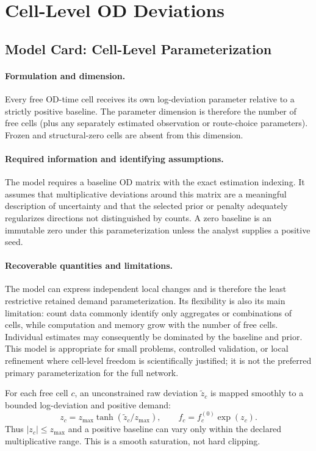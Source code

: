 
\section{Cell-Level OD Deviations}

\subsection{Model Card: Cell-Level Parameterization}

\paragraph{Formulation and dimension.}
Every free OD-time cell receives its own log-deviation parameter relative to a
strictly positive baseline.  The parameter dimension is therefore the number
of free cells (plus any separately estimated observation or route-choice
parameters).  Frozen and structural-zero cells are absent from this dimension.

\paragraph{Required information and identifying assumptions.}
The model requires a baseline OD matrix with the exact estimation indexing.
It assumes that multiplicative deviations around this matrix are a meaningful
description of uncertainty and that the selected prior or penalty adequately
regularizes directions not distinguished by counts.  A zero baseline is an
immutable zero under this parameterization unless the analyst supplies a
positive seed.

\paragraph{Recoverable quantities and limitations.}
The model can express independent local changes and is therefore the least
restrictive retained demand parameterization.  Its flexibility is also its
main limitation: count data commonly identify only aggregates or combinations
of cells, while computation and memory grow with the number of free cells.
Individual estimates may consequently be dominated by the baseline and prior.
This model is appropriate for small problems, controlled validation, or local
refinement where cell-level freedom is scientifically justified; it is not the
preferred primary parameterization for the full network.



For each free cell $c$, an unconstrained raw deviation $\widetilde z_c$ is
mapped smoothly to a bounded log-deviation and positive demand:
\[
 z_c=z_{\max}\tanh(\widetilde z_c/z_{\max}),
 \qquad
 f_c=f_c^{(0)}\exp(z_c).
\]
Thus $|z_c|\leq z_{\max}$ and a positive baseline can vary only within the
declared multiplicative range. This is a smooth saturation, not hard clipping.


